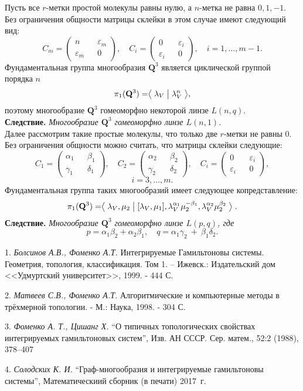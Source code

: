 Пусть все $r$-метки простой молекулы равны нулю, а $n$-метка не равна $0, 1, -1$.
Без ограничения общности матрицы склейки в этом случае имеют следующий вид:
$$
C_m = \begin{pmatrix} n && \varepsilon_m \\ \varepsilon_m && 0 \end{pmatrix}, \quad C_i = \begin{pmatrix} 0 && \varepsilon_i \\ \varepsilon_i && 0 \end{pmatrix},\quad i = 1,\dots, m-1.
$$
Фундаментальная группа многообразия $\mathbf{Q}^3$ является циклической группой порядка $n$
$$
\pi_1(\mathbf{Q}^3) = \bigm\langle \lambda_V \bigm| \lambda_V^n \bigm\rangle,
$$
поэтому многообразие $\mathbf{Q}^3$ гомеоморфно некоторой линзе $L(n, q)$.
\\

\textbf{Следствие.}{ \it
Многообразие $\mathbf{Q}^3$ гомеоморфно линзе $L(n, 1)$.}
\\

Далее рассмотрим такие простые молекулы, что только две $r$-метки не равны 0.
Без ограничения общности можно считать, что матрицы склейки следующие:
$$
C_1 = \begin{pmatrix} \alpha_1 && \beta_1 \\ \gamma_1 && \delta_1 \end{pmatrix}, \quad
C_2 = \begin{pmatrix} \alpha_2 && \beta_2 \\ \gamma_2 && \delta_2 \end{pmatrix},
\quad C_i = \begin{pmatrix} 0 && \varepsilon_i \\ \varepsilon_i && 0 \end{pmatrix},
$$
$$
i = 3,\dots, m.
$$
Фундаментальная группа таких многообразий имеет следующее копредставление:
$$
\pi_1(\mathbf{Q}^3) = \bigm\langle \lambda_V, \mu_2 \bigm|  [\lambda_V, \mu_1],
\lambda^{\alpha_1}_V\mu^{-\beta_1}_2, \lambda^{\alpha_2}_V\mu^{\beta_2}_2 \bigm\rangle.
$$
\textbf{Следствие.} {\it
Многообразие $\mathbf{Q}^3$ гомеоморфно линзе $L(p, q)$, где
}
$$
p = \alpha_1\beta_2 + \alpha_2\beta_1, \quad q = \alpha_1\gamma_2~+~\beta_1\delta_2.
$$

\litlist

1. {\it Болсинов А.В., Фоменко А.Т.}  Интегрируемые Гамильтоновы системы. Геометрия, топология, классификация. Том 1. -- Ижевск.: Издательский дом <<Удмуртский университет>>, 1999. - 444 С.

2. {\it Матвеев С.В., Фоменко А.Т.} Алгоритмические и компьютерные методы в трёхмерной топологии.  - М.: Наука, 1998. - 304 С.

3. {\it Фоменко А. Т., Цишанг Х.} “О типичных топологических свойствах интегрируемых гамильтоновых систем”, Изв. АН СССР. Сер. матем., 52:2 (1988), 378–407

4. {\it Солодских К. И.} “Граф-многообразия и интегрируемые гамильтоновы системы”, Математическиий сборник (в печати) 2017~г.

